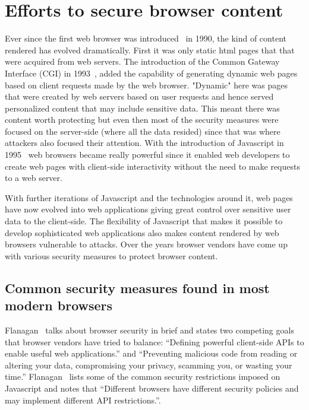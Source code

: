 \section{Efforts to secure browser content}
Ever since the first web browser was introduced~\cite{nexus} in 1990, the kind of
content rendered has evolved dramatically. First it was only static html pages that
that were acquired from web servers. The introduction of the Common Gateway
Interface (CGI) in 1993~\cite{cgi}, added the capability of generating dynamic
web pages based on client requests made by the web browser. "Dynamic" here was
pages that were created by web servers based on user requests and hence served
personalized content that may include sensitive data. This meant there was content
worth protecting but even then most of the security measures were focused
on the server-side (where all the data resided) since that was where attackers
also focused their attention. With the introduction of Javascript in 1995~\cite{js10days}
web browsers became really powerful since it enabled web developers to create web
pages with client-side interactivity without the need to make requests to a web server.

With further iterations of Javascript and the technologies around it, web pages have
now evolved into web applications giving great control over sensitive user data to the
client-side. The flexibility of Javascript that makes it possible to develop sophisticated
web applications also makes content rendered by web browsers vulnerable to attacks.
Over the years browser vendors have come up with various security measures to
protect browser content.

\subsection{Common security measures found in most modern browsers}
Flanagan~\cite[Section~13.6]{flanagan2011javascript} talks about browser security
in brief and states two competing goals that browser vendors have tried to balance:
``Defining powerful client-side APIs to enable useful web applications.'' and
``Preventing malicious code from reading or altering your data, compromising your
privacy, scamming you, or wasting your time.'' Flanagan~\cite[Section~13.6.1]{flanagan2011javascript}
lists some of the common security restrictions imposed on Javascript and notes
that ``Different browsers have different security policies and may implement
different API restrictions.''.

